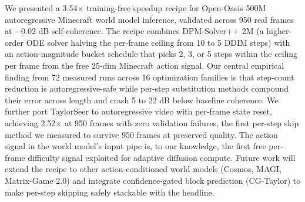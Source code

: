 \documentclass[10pt,letterpaper,twocolumn]{article}
\begin{document}
We presented a 3.54$\times$ training-free speedup recipe for Open-Oasis 500M autoregressive Minecraft world model inference, validated across 950 real frames at $-0.02$ dB self-coherence. The recipe combines DPM-Solver++ 2M (a higher-order ODE solver halving the per-frame ceiling from 10 to 5 DDIM steps) with an action-magnitude bucket schedule that picks 2, 3, or 5 steps within the ceiling per frame from the free 25-dim Minecraft action signal. Our central empirical finding from 72 measured runs across 16 optimization families is that step-count reduction is autoregressive-safe while per-step substitution methods compound their error across length and crash 5 to 22 dB below baseline coherence. We further port TaylorSeer to autoregressive video with per-frame state reset, achieving 2.52$\times$ at 950 frames with zero validation failures, the first per-step skip method we measured to survive 950 frames at preserved quality. The action signal in the world model's input pipe is, to our knowledge, the first free per-frame difficulty signal exploited for adaptive diffusion compute. Future work will extend the recipe to other action-conditioned world models (Cosmos, MAGI, Matrix-Game 2.0) and integrate confidence-gated block prediction (CG-Taylor) to make per-step skipping safely stackable with the headline.


\end{document}
